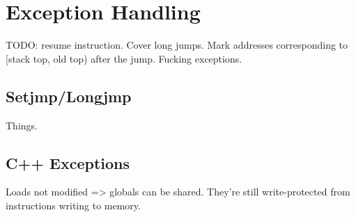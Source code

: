 \chapter {Exception Handling}

TODO: resume instruction. Cover long jumps. Mark addresses corresponding to
[stack top, old top) after the jump. Fucking exceptions.

\section {Setjmp/Longjmp}

Things.


\section {C++ Exceptions}

Loads not modified => globals can be shared. They're still write-protected from
instructions writing to memory.


